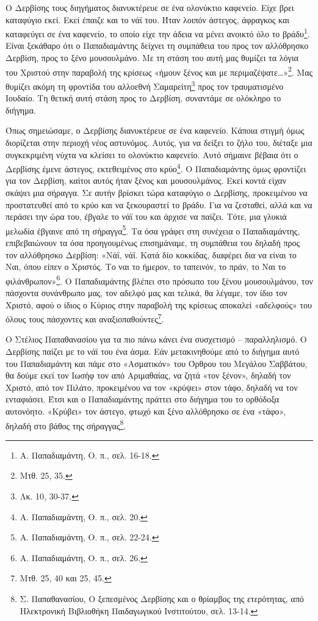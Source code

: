 \documentclass{article}
\begin{document}
Ο Δερβίσης τους διηγήματος διανυκτέρευε σε ένα ολονύκτιο καφενείο. Είχε βρει καταφύγιο εκεί. Εκεί έπαιζε και το νάϊ του. Ήταν λοιπόν άστεγος, άφραγκος και καταφεύγει σε  ένα καφενείο, το οποίο είχε την άδεια να μένει ανοικτό όλο το βράδυ\footnote{Α. Παπαδιαμάντη, Ο. π., σελ. 16-18.}. Είναι ξεκάθαρο ότι ο Παπαδιαμάντης δείχνει τη συμπάθεια του προς τον αλλόθρησκο Δερβίση, προς το ξένο μουσουλμάνο. Με τη στάση του αυτή μας θυμίζει τα λόγια του Χριστού στην παραβολή της κρίσεως «ήμουν ξένος και με περιμαζέψατε…»\footnote{Μτθ. 25, 35.}. Μας θυμίζει ακόμη τη φροντίδα του αλλοεθνή Σαμαρείτη\footnote{Λκ. 10, 30-37.}  προς τον τραυματισμένο Ιουδαίο. Τη θετική αυτή στάση προς το Δερβίση, συναντάμε σε ολόκληρο το διήγημα.

Όπως σημειώσαμε, ο Δερβίσης διανυκτέρευε σε ένα καφενείο. Κάποια στιγμή όμως διορίζεται στην περιοχή νέος αστυνόμος. Αυτός, για να δείξει το ζήλο του, διέταξε μια συγκεκριμένη νύχτα να κλείσει το ολονύκτιο καφενείο. Αυτό σήμαινε βέβαια ότι ο Δερβίσης έμενε άστεγος, εκτεθειμένος στο κρύο\footnote{Α. Παπαδιαμάντη, Ο. π., σελ. 20.}. Ο Παπαδιαμάντης όμως φροντίζει για τον Δερβίση, καίτοι αυτός ήταν ξένος και μουσουλμάνος. Εκεί κοντά είχαν σκάψει μια σήραγγα. Σε αυτήν βρίσκει τώρα καταφύγιο ο Δερβίσης, προκειμένου να προστατευθεί από το κρύο και να ξεκουραστεί το βράδυ. Για να ζεσταθεί, αλλά και να περάσει την ώρα του, έβγαλε το νάϊ του και άρχισε να παίζει. Τότε, μια γλυκιά μελωδία έβγαινε από τη σήραγγα\footnote{Α. Παπαδιαμάντη, Ο. π., σελ. 22-24.}. Τα όσα γράφει στη συνέχεια ο Παπαδιαμάντης, επιβεβαιώνουν τα όσα προηγουμένως επισημάναμε, τη συμπάθεια του δηλαδή προς τον αλλόθρησκο Δερβίση: «Νάϊ, νάϊ. Κατά δίο κοκκίδας, διαφέρει δια να είναι το Ναι, όπου είπεν ο Χριστός. Το ναι το ήμερον, το ταπεινόν, το πράν, το Ναι το φιλάνθρωπον»\footnote{Α. Παπαδιαμάντη, Ο. π., σελ. 26.}. Ο Παπαδιαμάντης βλέπει στο πρόσωπο του ξένου μουσουλμάνου, τον πάσχοντα συνάνθρωπο μας, τον αδελφό μας και τελικά, θα λέγαμε, τον ίδιο τον Χριστό, αφού ο ίδιος ο Κύριος στην παραβολή της κρίσεως αποκαλεί «αδελφούς» του όλους τους πάσχοντες και αναξιοπαθούντες\footnote{Μτθ. 25, 40 και 25, 45.}.

Ο Στέλιος Παπαθανασίου για τα πιο πάνω κάνει ένα συσχετισμό – παραλληλισμό. Ο Δερβίσης παίζει με το νάϊ του ένα άσμα. Εάν μετακινηθούμε από το διήγημα αυτό του Παπαδιαμάντη και πάμε στο «Ασματικόν» του Όρθρου του Μεγάλου Σαββάτου, θα δούμε εκεί τον Ιωσήφ τον από Αριμαθαίας, να ζητά «τον ξένον», δηλαδή τον Χριστό, από τον Πιλάτο, προκειμένου να τον «κρύψει» στον τάφο, δηλαδή να τον ενταφιάσει. Έτσι και ο Παπαδιαμάντης πράττει στο διήγημα του το ορθόδοξα αυτονόητο. «Κρύβει» τον άστεγο, φτωχό και ξένο αλλόθρησκο σε ένα «τάφο», δηλαδή στο βάθος της σήραγγας\footnote{Σ. Παπαθανασίου, Ο ξεπεσμένος Δερβίσης και ο θρίαμβος της ετερότητας, από Ηλεκτρονική Βιβλιοθήκη Παιδαγωγικού Ινστιτούτου, σελ. 13-14.}.
\end{document}
